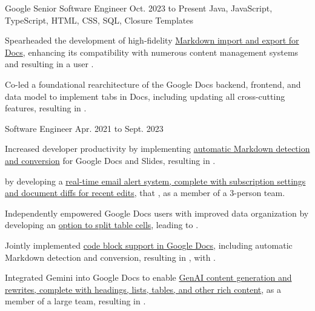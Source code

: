 
\begin{cventry}
    {Google}
    {Senior Software Engineer}
    {Oct. 2023 to Present}
    {Java, JavaScript, TypeScript, HTML, CSS, SQL, Closure Templates}
    \begin{cvitems}
        \item Spearheaded the development of high-fidelity \href{https://workspaceupdates.googleblog.com/2024/07/import-and-export-markdown-in-google-docs.html}{Markdown import and export for Docs}, enhancing its compatibility with numerous content management systems and resulting in a user . 
        \item Co-led a foundational rearchitecture of the Google Docs backend, frontend, and data model to implement tabs in Docs, including updating all cross-cutting features, resulting in .
    \end{cvitems}
\end{cventry}

\begin{cventry}
    {}
    {Software Engineer}
    {Apr. 2021 to Sept. 2023}{}
    \begin{cvitems}
        \item Increased developer productivity by implementing \href{https://workspaceupdates.googleblog.com/2022/03/compose-with-markdown-in-google-docs-on.html}{automatic Markdown detection and conversion} for Google Docs and Slides, resulting in .
        \item {} by developing a \href{https://workspaceupdates.googleblog.com/2022/07/edit-notifications-for-document-content-changes.html}{real-time email alert system, complete with subscription settings and document diffs for recent edits}, that , as a member of a 3-person team.
        \item Independently empowered Google Docs users with improved data organization by developing an \href{https://workspaceupdates.googleblog.com/2022/10/split-table-cells-in-google-docs.html}{option to split table cells}, leading to .
        \item Jointly implemented \href{https://workspaceupdates.googleblog.com/2022/12/format-display-code-google-docs.html}{code block support in Google Docs}, including automatic Markdown detection and conversion, resulting in , with .
        \item Integrated Gemini into Google Docs to enable \href{https://workspace.google.com/blog/product-announcements/generative-ai}{GenAI content generation and rewrites, complete with headings, lists, tables, and other rich content}, as a member of a large team, resulting in .
    \end{cvitems}
\end{cventry}

